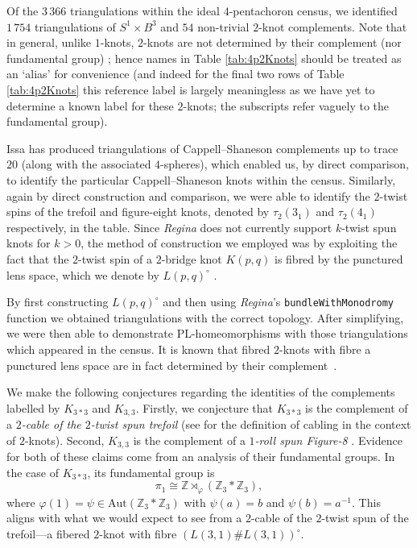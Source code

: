 \documentclass[pdflatex,sn-mathphys-num]{sn-jnl}
\theoremstyle{thmstyleone}%
\theoremstyle{thmstyletwo}%
\theoremstyle{thmstylethree}%
\theoremstyle{remark}
\begin{document}
Of the $3\,366$ triangulations within the ideal $4$-pentachoron census, we identified $1\,754$ triangulations of $S^1\times B^3$ and $54$ non-trivial $2$-knot complements. 
Note that in general, unlike $1$-knots, $2$-knots are not determined by their complement (nor fundamental group) \cite{CappellShaneson}; hence names in Table \ref{tab:4p2Knots} should be treated as an `alias' for convenience (and indeed for the final two rows of Table \ref{tab:4p2Knots} this reference label is largely meaningless as we have yet to determine a known label for these $2$-knots; the subscripts refer vaguely to the fundamental group). 

Issa \cite{Issa} has produced triangulations of Cappell--Shaneson complements up to trace $20$ (along with the associated $4$-spheres), which enabled us, by direct comparison, to identify the particular Cappell--Shaneson knots within the census. 
Similarly, again by direct construction and comparison, we were able to identify the $2$-twist spins of the trefoil and figure-eight knots, denoted by $\tau_2(3_1)$ and $\tau_2(4_1)$ respectively, in the table. Since \emph{Regina} does not currently support $k$-twist spun knots for $k>0$, the method of construction we employed was by exploiting the fact that the $2$-twist spin of a $2$-bridge knot $K(p,q)$ is fibred by the punctured lens space, which we denote by $L(p,q)^\circ$ \cite{Zeeman-TwistingSpunKnots,Teragaito-fibered2KnotsLens}. 

By first constructing $L(p,q)^\circ$ and then using \emph{Regina}'s \texttt{bundleWithMonodromy} function we obtained triangulations with the correct topology. After simplifying, we were then able to demonstrate PL-homeomorphisms with those triangulations which appeared in the census. 
It is known that fibred $2$-knots with fibre a punctured lens space are in fact determined by their complement~\cite{PlotnickSuciu-fiberPuncturedLensDetExt}. 

We make the following conjectures regarding the identities of the complements labelled by $K_{3*3}$ and $K_{3,3}$. 
Firstly, we conjecture that $K_{3*3}$ is the complement of a \emph{$2$-cable of the $2$-twist spun trefoil} (see \cite{Teragaito-fibered2KnotsLens} for the definition of cabling in the context of $2$-knots). 
Second, $K_{3,3}$ is the complement of a \emph{$1$-roll spun Figure-8} \cite{fox-rolling}. 
Evidence for both of these claims come from an analysis of their fundamental groups.
In the case of $K_{3*3}$, its fundamental group is
\[
	\pi_1\cong\mathbb{Z}\rtimes_{\varphi}(\mathbb{Z}_3*\mathbb{Z}_3),
\]
where $\varphi(1)=\psi\in\mathrm{Aut}(\mathbb{Z}_3*\mathbb{Z}_3)$ with $\psi(a)=b$ and $\psi(b)= a^{-1}$. 
This aligns with what we would expect to see from a $2$-cable of the $2$-twist spun of the trefoil---a fibered $2$-knot with fibre $(L(3,1)\# L(3,1))^\circ$.
\end{document}
